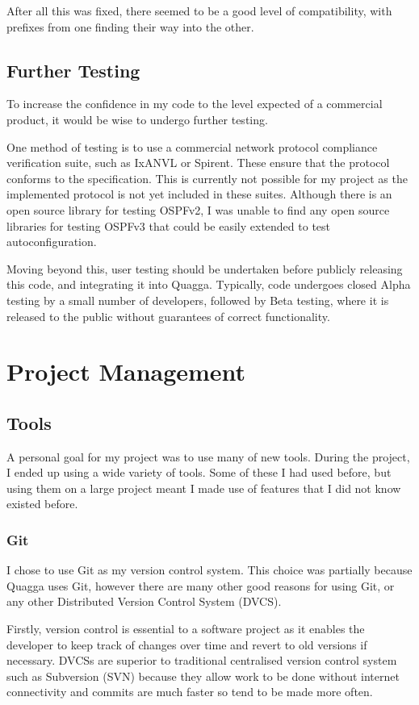 After all this was fixed, there seemed to be a good level of compatibility,
with prefixes from one finding their way into the other.

\section{Further Testing}
To increase the confidence in my code to the level expected of a commercial
product, it would be wise to undergo further testing. 

One method of testing is to use a commercial network protocol compliance
verification suite, such as IxANVL or Spirent. These ensure that the protocol
conforms to the specification. This is currently not possible for my project as
the implemented protocol is not yet included in these suites.  Although there
is an open source library for testing OSPFv2, I was unable to find any open
source libraries for testing OSPFv3 that could be easily extended to test
autoconfiguration. 

Moving beyond this, user testing should be undertaken before publicly releasing
this code, and integrating it into Quagga. Typically, code undergoes closed
Alpha testing by a small number of developers, followed by Beta testing, where
it is released to the public without guarantees of correct functionality.

\chapter{Project Management}
\section{Tools}
A personal goal for my project was to use many of new tools. During the
project, I ended up using a wide variety of tools. Some of these I had used
before, but using them on a large project meant I made use of features that I
did not know existed before.

\subsection{Git}
I chose to use Git as my version control system. This choice was
partially because Quagga uses Git, however there are many other good reasons for
using Git, or any other Distributed Version Control System (DVCS).

Firstly, version control is essential to a software project as it enables the
developer to keep track of changes over time and revert to old versions if
necessary. DVCSs are superior to traditional centralised version control
system such as Subversion (SVN) because they allow work to be done without internet
connectivity and commits are much faster so tend to be made more often. 

